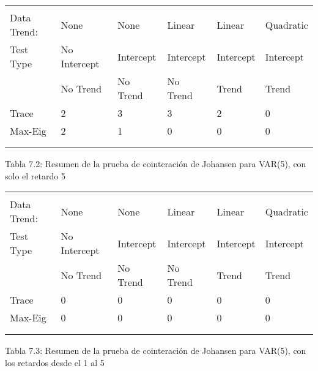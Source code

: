 \begin{table}[H]
\begin{center}
\begin{tabular}{|p{58pt}|l|l|l|l|l|}
\hline
& 
& 
& 
& 
& 
 \\
\hline
& 
& 
& 
& 
& 
 \\
\hline
Data Trend:& 
None& 
None& 
Linear& 
Linear& 
Quadratic \\
\hline
Test Type& 
No Intercept& 
Intercept& 
Intercept& 
Intercept& 
Intercept \\
\hline
& 
No Trend& 
No Trend& 
No Trend& 
Trend& 
Trend \\
\hline
Trace& 
2& 
3& 
3& 
2& 
0 \\
\hline
Max-Eig& 
2& 
1& 
0& 
0& 
0 \\
\hline
& 
& 
& 
& 
& 
 \\
\hline
& 
& 
& 
& 
& 
 \\
\hline
\end{tabular}
\label{tab9}
\end{center}
\end{table}

\begin{center}
Tabla 7.2: Resumen de la prueba de cointeraci\'{o}n de Johansen para VAR(5), 
con solo el retardo 5
\end{center}

\begin{table}[H]
\begin{center}
\begin{tabular}{|p{58pt}|l|l|l|l|l|}
\hline
& 
& 
& 
& 
& 
 \\
\hline
& 
& 
& 
& 
& 
 \\
\hline
Data Trend:& 
None& 
None& 
Linear& 
Linear& 
Quadratic \\
\hline
Test Type& 
No Intercept& 
Intercept& 
Intercept& 
Intercept& 
Intercept \\
\hline
& 
No Trend& 
No Trend& 
No Trend& 
Trend& 
Trend \\
\hline
Trace& 
0& 
0& 
0& 
0& 
0 \\
\hline
Max-Eig& 
0& 
0& 
0& 
0& 
0 \\
\hline
& 
& 
& 
& 
& 
 \\
\hline
& 
& 
& 
& 
& 
 \\
\hline
\end{tabular}
\label{tab10}
\end{center}
\end{table}

\begin{center}
Tabla 7.3: Resumen de la prueba de cointeraci\'{o}n de Johansen para VAR(5), 
con los retardos desde el 1 al 5 \newline

\end{center}

